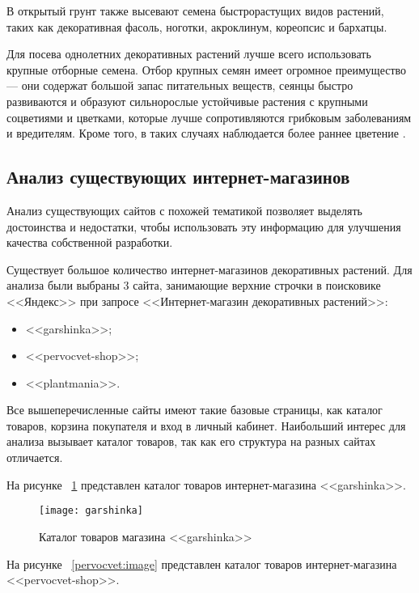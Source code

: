 В открытый грунт также высевают семена быстрорастущих видов растений, таких как декоративная фасоль, ноготки, акроклинум, кореопсис и бархатцы.

Для посева однолетних декоративных растений лучше всего использовать крупные отборные семена. Отбор крупных семян имеет огромное преимущество — они содержат большой запас питательных веществ, сеянцы быстро развиваются и образуют сильнорослые устойчивые растения с крупными соцветиями и цветками, которые лучше сопротивляются грибковым заболеваниям и вредителям. Кроме того, в таких случаях наблюдается более раннее цветение \cite{aleksandrova}.


\subsection{Анализ существующих интернет-магазинов}
\label{shopsAnalize}
Анализ существующих сайтов с похожей тематикой позволяет выделять достоинства и недостатки, чтобы использовать эту информацию для улучшения качества собственной разработки.

Существует большое количество интернет-магазинов декоративных растений. Для анализа были выбраны 3 сайта, занимающие верхние строчки в поисковике <<Яндекс>> при запросе <<Интернет-магазин декоративных растений>>:
\begin{itemize}
	\item <<garshinka>>;
	\item <<pervocvet-shop>>;
	\item <<plantmania>>.
\end{itemize}

Все вышеперечисленные сайты имеют такие базовые страницы, как каталог товаров, корзина покупателя и вход в личный кабинет. Наибольший интерес для анализа вызывает каталог товаров, так как  его структура на разных сайтах отличается.

На рисунке ~\ref{garshinka:image} представлен каталог товаров интернет-магазина <<garshinka>>.

\begin{figure}[h!]
	\texttt{[image: garshinka]}
	\caption{Каталог товаров магазина <<garshinka>>}
	\label{garshinka:image}
\end{figure}


На рисунке ~\ref{pervocvet:image} представлен каталог товаров интернет-магазина <<pervocvet-shop>>.

